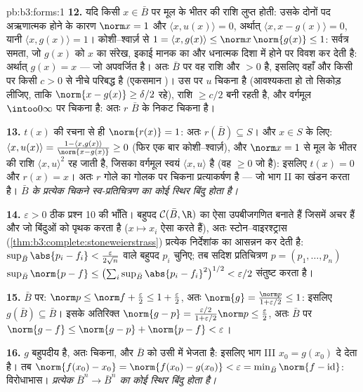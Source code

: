 \begin{solution}{pb:b3:forms:1}
\textbf{12.} यदि किसी $x \in \bar B$ पर मूल के भीतर की राशि
लुप्त होती: उसके दोनों पद अऋणात्मक होने के कारण $\norm x = 1$
और $\langle x, u(x)\rangle = 0$, अर्थात् $\langle x, x -
g(x)\rangle = 0$, यानी $\langle x, g(x)\rangle = 1$।
कोशी--श्वार्ज़ से $1 = \langle x, g(x)\rangle \leq
\norm x\,\norm{g(x)} \leq 1$: सर्वत्र समता, जो $g(x)$ को $x$
का संरेख, इकाई मानक का और धनात्मक दिशा में होने पर विवश कर
देती है: अर्थात् $g(x) = x$ --- जो अपवर्जित है। अतः $\bar B$
पर वह राशि  और $> 0$ है, इसलिए वहाँ और किसी  पर
किसी $c > 0$ से नीचे परिबद्ध है (एकसमान )। उस
 पर $u$ चिकना है (आवश्यकता हो तो सिकोड़ लीजिए, ताकि
$\norm{x - g(x)} \geq \delta/2$ रहे), राशि $\geq c/2$ बनी
रहती है, और वर्गमूल $\intoo0\infty$ पर चिकना है: अतः $r$
$\bar B$ के निकट चिकना है।

\textbf{13.} $t(x)$ की रचना से ही $\norm{r(x)} = 1$: अतः
$r(\bar B) \subseteq S$। और $x \in S$ के लिए: $\langle x,
u(x)\rangle = \frac{1 - \langle x, g(x)\rangle}{\norm{x -
g(x)}} \geq 0$ (फिर एक बार कोशी--श्वार्ज़), और $\norm x =
1$ से मूल के भीतर की राशि $\langle x, u\rangle^2$ रह जाती है,
जिसका वर्गमूल स्वयं $\langle x, u\rangle$ है (वह $\geq
0$ जो है): इसलिए $t(x) = 0$ और $r(x) = x$। अतः $r$ गोले का
गोलक पर चिकना प्रत्याकर्षण है --- जो भाग II का खंडन करता है।
\emph{$\bar B$ के प्रत्येक चिकने स्व-प्रतिचित्रण का कोई स्थिर
बिंदु होता है।}

\textbf{14.} $\varepsilon > 0$ ठीक प्रश्न 10 की भाँति।
बहुपद $\mathcal C(\bar B,
\R)$ का ऐसा उपबीजगणित बनाते हैं जिसमें अचर हैं और जो बिंदुओं
को पृथक करता है ($x \mapsto x_i$ ऐसा करते हैं), अतः
स्टोन--वाइरश्ट्रास
(\cref{thm:b3:complete:stoneweierstrass}) प्रत्येक निर्देशांक
का आसन्नन कर देती है: $\sup_{\bar
B}\abs{p_i - f_i} < \frac{\varepsilon}{2\sqrt n}$ वाले बहुपद
$p_i$ चुनिए; तब सदिश प्रतिचित्रण $p = (p_1, \dots, p_n)$
$\sup_{\bar B}\norm{p - f} \leq
\bigl(\sum_i\sup_{\bar B}\abs{p_i - f_i}^2\bigr)^{1/2} <
\varepsilon/2$ संतुष्ट करता है।

\textbf{15.} $\bar B$ पर: $\norm p \leq \norm f +
\frac\varepsilon2 \leq 1 + \frac\varepsilon2$, अतः
$\norm{g} = \frac{\norm p}{1 + \varepsilon/2} \leq 1$:
इसलिए $g(\bar B) \subseteq \bar B$। इसके अतिरिक्त
$\norm{g - p} =
\frac{\varepsilon/2}{1 + \varepsilon/2}\norm p \leq
\frac\varepsilon2$, अतः $\bar B$ पर $\norm{g - f} \leq
\norm{g - p} + \norm{p - f} < \varepsilon$।

\textbf{16.} $g$ बहुपदीय है, अतः चिकना, और $\bar B$ को उसी
में भेजता है: इसलिए भाग III $x_0 = g(x_0)$ दे देता है। तब
$\norm{f(x_0) - x_0} = \norm{f(x_0) - g(x_0)} <
\varepsilon = \min_{\bar B}\norm{f - \operatorname{id}}$:
विरोधाभास। \emph{प्रत्येक  $\bar B^n \to
\bar B^n$ का कोई स्थिर बिंदु होता है।}


\end{solution}
